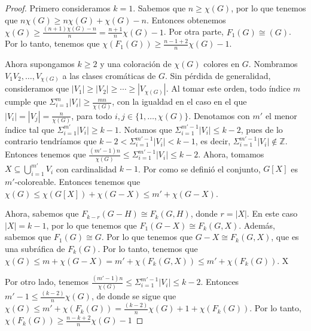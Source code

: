 \begin{proof}
    Primero consideramos $k=1$. Sabemos que $n \geq \chi(G)$, por lo que tenemos
    que $n\chi(G) \geq n\chi(G) + \chi(G) -n$. Entonces obtenemos $\chi (G) \geq
    \frac{(n+1)\chi(G)-n}{n} = \frac{n+1}{n}\chi (G) -1$. Por otra parte,
    $F_1(G) \cong (G)$. Por lo tanto, tenemos que $\chi(F_1(G)) \geq
    \frac{n-1+2}{n} \chi(G) -1$.
        
    Ahora supongamos $k \geq 2$ y una coloraci\'on de $\chi(G)$ colores en $G$.
    Nombramos $V_1 V_2, \dots, V_{\chi(G)}$ a las clases crom\'aticas de $G$.
    Sin p\'erdida de generalidad, consideramos que $|V_1|\geq |V_2|\geq \cdots
    \geq |V_{\chi(G)}|$. Al tomar este orden, todo \'indice $m$ cumple que
    $\Sigma_{i=1}^{m}|V_i| \geq \frac{mn}{\chi(G)}$, con la igualdad en el caso
    en el que $|V_i| = |V_j| = \frac{n}{\chi(G)}$, para todo $i,j \in \{1,
    \dots, \chi(G)\}$. Denotamos con $m'$ el menor \'indice tal que
    $\Sigma_{i=1}^{m'}|V_i| \geq k-1$. Notamos que $\Sigma_{i=1}^{m'-1}|V_i|
    \leq k-2$, pues de lo contrario tendr\'iamos que
    $k-2<\Sigma_{i=1}^{m'-1}|V_i| < k-1$, es decir, $\Sigma_{i=1}^{m'-1}|V_i|
    \notin \mathbb{Z}$. Entonces tenemos que $\frac{(m'-1)n}{\chi(G)}\leq
    \Sigma_{i=1}^{m'-1}|V_i| \leq k-2$. Ahora, tomamos $X \subseteq
    \bigcup_{i=1}^{m'} V_i$ con cardinalidad $k-1$. Por como se defini\'o el
    conjunto, $G[X]$ es $m'$-coloreable.
    Entonces tenemos que  $\chi(G) \leq \chi(G[X])+\chi(G-X) \leq m' +
    \chi(G-X)$.
        
    Ahora, sabemos que $F_{k-r}(G-H) \cong F_k(G,H)$, donde $r = |X|$. En este
    caso $|X| = k-1$, por lo que tenemos que $F_1(G-X) \cong F_k(G,X)$.
    Adem\'as, sabemos que $F_1(G) \cong G$. Por lo que tenemos que $G-X \cong
    F_k(G,X)$, que es una subr\'afica de $F_k(G)$. Por lo tanto, tenemos que
    $\chi(G) \leq m + \chi(G-X) = m' + \chi(F_k(G,X)) \leq m' + \chi(F_k(G))$. X
            
    Por otro lado, tenemos $\frac{(m'-1)n}{\chi(G)}\leq \Sigma_{i=1}^{m'-1}|V_i|
    \leq k-2$. Entonces $m'-1 \leq \frac{(k-2)}{n}\chi(G)$, de donde se sigue
    que $\chi(G) \leq m' + \chi(F_k(G)) = \frac{(k-2)}{n}\chi(G) +1 +
    \chi(F_k(G))$. Por lo tanto, $\chi(F_k(G)) \geq \frac{n-k+2}{n} \chi(G) -1$
\end{proof}

